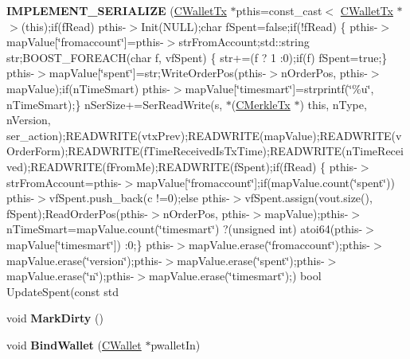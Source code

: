 \begin{DoxyCompactItemize}
{\bfseries I\+M\+P\+L\+E\+M\+E\+N\+T\+\_\+\+S\+E\+R\+I\+A\+L\+I\+ZE} (\mbox{\hyperlink{class_c_wallet_tx}{C\+Wallet\+Tx}} $\ast$pthis=const\+\_\+cast$<$ \mbox{\hyperlink{class_c_wallet_tx}{C\+Wallet\+Tx}} $\ast$ $>$(this);if(f\+Read) pthis-\/$>$Init(N\+U\+LL);char f\+Spent=false;if(!f\+Read) \{ pthis-\/$>$map\+Value\mbox{[}\char`\"{}fromaccount\char`\"{}\mbox{]}=pthis-\/$>$str\+From\+Account;std\+::string str;B\+O\+O\+S\+T\+\_\+\+F\+O\+R\+E\+A\+CH(char f, vf\+Spent) \{ str+=(f ? \textquotesingle{}1\textquotesingle{} \+:\textquotesingle{}0\textquotesingle{});if(f) f\+Spent=true;\} pthis-\/$>$map\+Value\mbox{[}\char`\"{}spent\char`\"{}\mbox{]}=str;Write\+Order\+Pos(pthis-\/$>$n\+Order\+Pos, pthis-\/$>$map\+Value);if(n\+Time\+Smart) pthis-\/$>$map\+Value\mbox{[}\char`\"{}timesmart\char`\"{}\mbox{]}=strprintf(\char`\"{}\%u\char`\"{}, n\+Time\+Smart);\} n\+Ser\+Size+=Ser\+Read\+Write(s, $\ast$(\mbox{\hyperlink{class_c_merkle_tx}{C\+Merkle\+Tx}} $\ast$) this, n\+Type, n\+Version, ser\+\_\+action);R\+E\+A\+D\+W\+R\+I\+TE(vtx\+Prev);R\+E\+A\+D\+W\+R\+I\+TE(map\+Value);R\+E\+A\+D\+W\+R\+I\+TE(v\+Order\+Form);R\+E\+A\+D\+W\+R\+I\+TE(f\+Time\+Received\+Is\+Tx\+Time);R\+E\+A\+D\+W\+R\+I\+TE(n\+Time\+Received);R\+E\+A\+D\+W\+R\+I\+TE(f\+From\+Me);R\+E\+A\+D\+W\+R\+I\+TE(f\+Spent);if(f\+Read) \{ pthis-\/$>$str\+From\+Account=pthis-\/$>$map\+Value\mbox{[}\char`\"{}fromaccount\char`\"{}\mbox{]};if(map\+Value.\+count(\char`\"{}spent\char`\"{})) pthis-\/$>$vf\+Spent.\+push\+\_\+back(c !=\textquotesingle{}0\textquotesingle{});else pthis-\/$>$vf\+Spent.\+assign(vout.\+size(), f\+Spent);Read\+Order\+Pos(pthis-\/$>$n\+Order\+Pos, pthis-\/$>$map\+Value);pthis-\/$>$n\+Time\+Smart=map\+Value.\+count(\char`\"{}timesmart\char`\"{}) ?(unsigned int) atoi64(pthis-\/$>$map\+Value\mbox{[}\char`\"{}timesmart\char`\"{}\mbox{]}) \+:0;\} pthis-\/$>$map\+Value.\+erase(\char`\"{}fromaccount\char`\"{});pthis-\/$>$map\+Value.\+erase(\char`\"{}version\char`\"{});pthis-\/$>$map\+Value.\+erase(\char`\"{}spent\char`\"{});pthis-\/$>$map\+Value.\+erase(\char`\"{}n\char`\"{});pthis-\/$>$map\+Value.\+erase(\char`\"{}timesmart\char`\"{});) bool Update\+Spent(const std
\item 
\mbox{\label{class_c_wallet_tx_ac8a376bcb955e437489504dc596b43cf}} 
void {\bfseries Mark\+Dirty} ()
\item 
\mbox{\label{class_c_wallet_tx_ab0ee7347584bff886dc24b9f63ff023c}} 
void {\bfseries Bind\+Wallet} (\mbox{\hyperlink{class_c_wallet}{C\+Wallet}} $\ast$pwallet\+In)

\end{DoxyCompactItemize}
